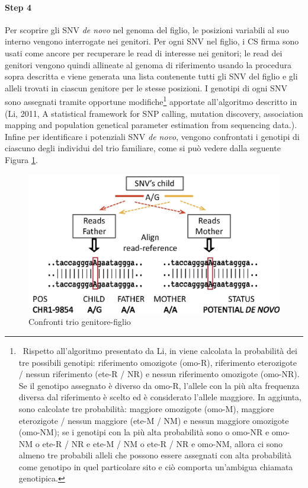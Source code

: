 \documentclass[../main.tex]{subfiles}
\begin{document}
\paragraph{Step 4} Per scoprire gli SNV \textit{de novo} nel genoma del figlio, le posizioni variabili al suo interno vengono interrogate nei genitori. Per ogni SNV nel figlio, i CS firma sono usati come ancore per recuperare le read di interesse nei genitori; le read dei genitori vengono quindi allineate al genoma di riferimento usando la procedura sopra descritta e viene generata una lista contenente tutti gli SNV del figlio e gli alleli trovati in ciascun genitore per le stesse posizioni. I genotipi di ogni SNV sono assegnati tramite opportune modifiche\footnote{\ Rispetto all'algoritmo presentato da Li, in \cite{gomez-romero2018cobasi} viene calcolata la probabilità dei tre possibili genotipi: riferimento omozigote (omo-R), riferimento eterozigote / nessun riferimento (ete-R / NR) e nessun riferimento omozigote (omo-NR). Se il genotipo assegnato è diverso da omo-R, l'allele con la più alta frequenza diversa dal riferimento è scelto ed è considerato l'allele maggiore. In aggiunta, sono calcolate tre probabilità: maggiore omozigote (omo-M), maggiore eterozigote / nessun maggiore (ete-M / NM) e nessun maggiore omozigote (omo-NM); se i genotipi con la più alta probabilità sono o omo-NR e omo-NM o ete-R / NR e ete-M / NM o ete-R / NR e omo-NM, allora ci sono almeno tre probabili alleli che possono essere assegnati con alta probabilità come genotipo in quel particolare sito e ciò comporta un'ambigua chiamata genotipica.} apportate all'algoritmo descritto in (Li, 2011, A statistical framework for SNP calling, mutation discovery, association mapping and population genetical parameter estimation from sequencing data.). Infine per identificare i potenziali SNV \textit{de novo}, vengono confrontati i genotipi di ciascuno degli individui del trio familiare, come si può vedere dalla seguente Figura \ref{fig:cobasi_align}.

 \begin{figure}[ht!]
	\centering
  	\captionsetup{justification=centering}
  	\includegraphics[scale=.20]{images/cobasi_align.png}
  	\caption{Confronti trio genitore-figlio}
  	\label{fig:cobasi_align}
\end{figure}
\end{document}
